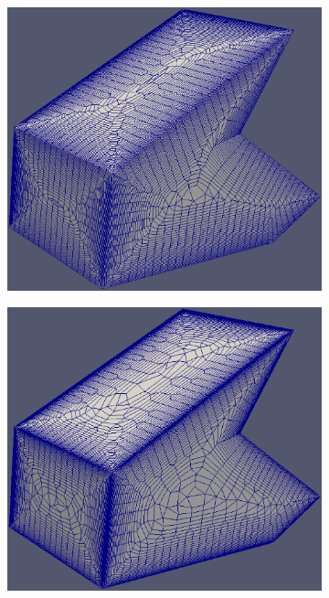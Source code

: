\documentclass[conf]{new-aiaa}
\begin{document}
\begin{figure}
\centering
\begin{subfigure}{0.4\textwidth}
\centering
\includegraphics[width = 0.9\linewidth]{meshCases/variousAngle-x0.5-g1.04/variousAngle.eps}
\caption{}
\label{fig-variousAngle-low}
\end{subfigure}%
\begin{subfigure}{0.4\textwidth}
\centering
\includegraphics[width=0.9\linewidth]{meshCases/variousAngle-x0.3-g1.08/variousAngle.eps}
\caption{}
\label{fig-variousAngle-high}
\end{subfigure}

\end{figure}
\end{document}
